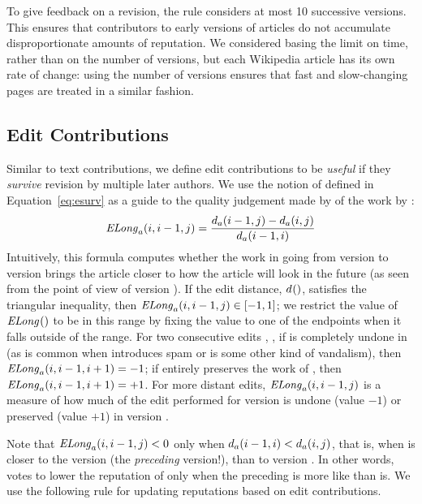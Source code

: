 To give feedback on a revision, the rule considers at most 10
successive versions. 
This ensures that contributors to early versions of articles do not
accumulate disproportionate amounts of reputation. 
We considered basing the limit on time, rather than on the number of
versions, but each Wikipedia article has its own rate of change:
using the number of versions ensures that fast and
slow-changing pages are treated in a similar fashion.

\subsection{Edit Contributions}

Similar to text contributions, we define edit contributions to
be \textit{useful} if they \textit{survive} revision by multiple
later authors.
We use the notion of  defined in
Equation~\ref{eq:esurv} as a guide to the quality judgement
made by  of the work by :
\begin{equation*}
\mathit{ELong}_{a}(i,i-1,j) = \frac{d_{a}(i-1,j) - d_{a}(i,j)}
                        {d_{a}(i-1,i)}
\end{equation*}
Intuitively, this formula computes whether the work in going
from version  to version  brings the
article closer to how the article will look in the future
(as seen from the point of view of version ).
If the edit distance, $d_{}()$,
satisfies the triangular inequality,
then $\mathit{ELong}_{a}(i,i-1,j) \in [-1,1]$;  
we restrict the value of $\mathit{ELong}_{}()$ to be in this
range by fixing the value to one of the endpoints when
it falls outside of the range.
For two consecutive edits , ,
if  is completely undone in 
(as is common when  introduces spam or is some other
kind of vandalism), then $\mathit{ELong}_{a}(i,i-1,i+1) = -1$; 
if  entirely preserves the work of ,
then $\mathit{ELong}_{a}(i,i-1,i+1) = +1$.
For more distant edits, $\mathit{ELong}_{a}(i,i-1,j)$ is a measure of how much of the
edit performed for version 
is undone (value $-1$) or preserved (value $+1$) in version . 

Note that $\mathit{ELong}_{a}(i,i-1,j) < 0$
only when
$d_{a}(i-1,i) < d_{a}(i,j)$,
that is,
when  is closer to the version 
(the \textit{preceding} version!), than to version .
In other words, 
votes to lower the reputation of 
only when the preceding  is more like 
than  is.
We use the following rule for updating reputations based on
edit contributions.

